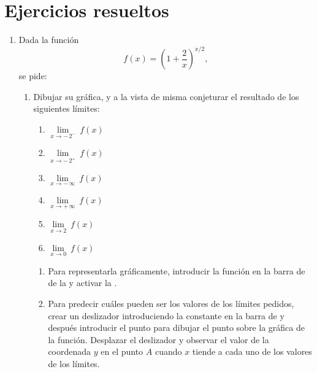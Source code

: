 \section{Ejercicios resueltos}
\begin{enumerate}[leftmargin=*]
\item Dada la función
      \[
      f(x)=\left( 1+\frac{2}{x}\right) ^{x/2},
      \]
      se pide:

      \begin{enumerate}
      \item Dibujar su gráfica, y a la vista de misma conjeturar el resultado de los siguientes límites:
            \begin{multicols}{2}
            \begin{enumerate}
            \item  $\lim\limits_{x\rightarrow -\,2^{-}}\ f(x)$
            \item  $\lim\limits_{x\rightarrow -\,2^{+}}\ f(x)$
            \item  $\lim\limits_{x\rightarrow -\,\infty }\ f(x)$
            \item  $\lim\limits_{x\rightarrow +\,\infty }\ f(x)$
            \item  $\lim\limits_{x\rightarrow 2}\ f(x)$
            \item  $\lim\limits_{x\rightarrow 0}\ f(x)$
            \end{enumerate}
            \end{multicols}

            \begin{indication}
            \begin{enumerate}
            \item Para representarla gráficamente, introducir la función  en la barra de  de la  y activar la .
            \item Para predecir cuáles pueden ser los valores de los límites pedidos, crear un deslizador introduciendo la constante  en la barra de  y después introducir el punto  para dibujar el punto sobre la gráfica de la función. Desplazar el deslizador y observar el valor de la coordenada $y$ en el punto $A$ cuando $x$ tiende a cada uno de los valores de los límites.
            \end{enumerate}
            \end{indication}


\end{enumerate}
\end{enumerate}
